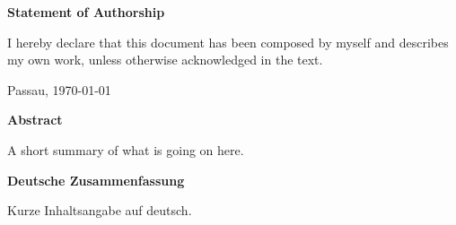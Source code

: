 \documentclass{thesisclass}
\begin{document}

\frontmatter
{}

\blankpage


\thispagestyle{plain}

\vspace*{\fill}

\centerline{\textbf{Statement of Authorship}}

\vspace{0.25cm}

I hereby declare that this document has been composed by myself and describes my own work, unless otherwise acknowledged in the text.

\vspace{2.5cm}

\hspace{0.25cm} Passau, \today

\vspace{2cm}

\blankpage


\thispagestyle{plain}

\begin{addmargin}{0.5cm}

      \centerline{\textbf{Abstract}}

      A short summary of what is going on here.

      \vskip 2cm

      \centerline{\textbf{Deutsche Zusammenfassung}}

      Kurze Inhaltsangabe auf deutsch.

\end{addmargin}

\blankpage


\tableofcontents
\blankpage


\mainmatter
{}









\cleardoublepage
{}
{}

{}
{} %





\cleardoublepage

\end{document}
